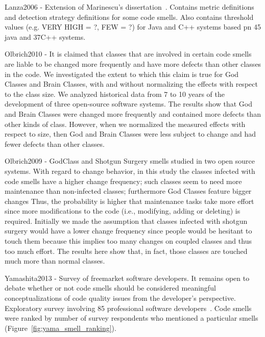 \documentclass{article}
\begin{document}
Lanza2006 - Extension of Marinescu's dissertation~\cite{Marinescu02}. Contains metric definitions and detection strategy definitions for some code smells. Also contains threshold values (e.g. VERY HIGH = ?, FEW = ?) for Java and C++ systems based pn 45 java and 37C++ systems.

Olbrich2010 - It is claimed that classes that are involved in certain code smells are liable to be changed more frequently and have more defects than other classes in the code. We investigated the extent to which this claim is true for God Classes and Brain Classes, with and without normalizing the effects with respect to the class size. We analyzed historical data from 7 to 10 years of the development of three open-source software systems. The results show that God and Brain Classes were changed more frequently and contained more defects than other kinds of class. However, when we normalized the measured effects with respect to size, then God and Brain Classes were less subject to change and had fewer defects than other classes.\cite{Olbrich2010} 

Olbrich2009 - GodClass and Shotgun Surgery smells studied in two open source systems. With regard to change behavior, in this study the classes infected with code smells have a higher change frequency; such classes seem to need more maintenance than non-infected classes; furthermore God Classes feature bigger changes Thus, the probability is higher that maintenance tasks take more effort since more modifications to the code (i.e., modifying, adding or deleting) is required. Initially we made the assumption that classes infected with shotgun surgery would have a lower change frequency since people would be hesitant to touch them because this implies too many changes on coupled classes and thus too much effort. The results here show that, in fact, those classes are touched much more than normal classes.\cite{Olbrich2009}

Yamashita2013 - Survey of freemarket software developers. It remains open to debate whether or not code smells should be considered meaningful conceptualizations of code quality issues from the developer’s perspective. Exploratory survey involving 85 professional software developers~\cite{Yamashita2013}. Code smells were ranked by number of survey respondents who mentioned a particular smells (Figure~\ref{fig:yama_smell_ranking}).
\end{document}
